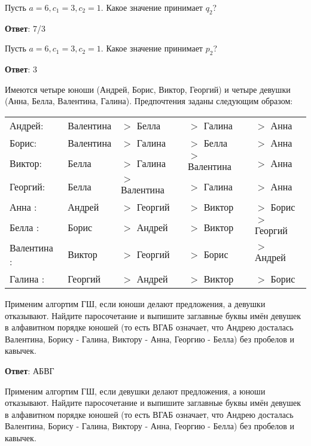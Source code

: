 \task
Пусть $a = 6, c_1 = 3, c_2 = 1$. Какое значение принимает $q_2$?

\textbf{Ответ}: 
7/3	 %

\solution %

\task Пусть $a=6, c_1=3, c_2=1$. Какое значение принимает $p_2$?

\textbf{Ответ}: 
3	%

\solution %

\task
Имеются четыре юноши (Андрей, Борис, Виктор, Георгий) и четыре девушки (Анна, Белла, Валентина, Галина). Предпочтения заданы следующим образом:

\begin{tabular}{lllll}
	\hline
	Андрей: &Валентина &$>$ Белла &$>$ Галина &$>$ Анна \\
	
	Борис:&Валентина &$>$ Галина &$>$ Белла &$>$ Анна \\
	
	Виктор:&Белла &$>$ Галина &$>$ Валентина &$>$ Анна \\
	
	Георгий:&Белла&$>$ Валентина &$>$ Галина &$>$ Анна \\
	
	Анна :&Андрей &$>$ Георгий &$>$ Виктор &$>$ Борис \\
	
	Белла :&Борис &$>$ Андрей &$>$ Виктор &$>$ Георгий \\
	
	Валентина :&Виктор &$>$ Георгий &$>$ Борис &$>$ Андрей \\
	
	Галина :&Георгий &$>$ Андрей &$>$ Виктор &$>$ Борис \\
	\hline
\end{tabular}

Применим алгортим ГШ, если юноши делают предложения, а девушки отказывают. Найдите паросочетание и выпишите заглавные буквы имён девушек в алфавитном порядке юношей (то есть ВГАБ означает, что Андрею досталась Валентина, Борису - Галина, Виктору - Анна, Георгию - Белла) без пробелов и кавычек.

\textbf{Ответ}: 
АБВГ	%

\solution %

\task 
Применим алгортим ГШ, если девушки делают предложения, а юноши отказывают. Найдите паросочетание и выпишите заглавные буквы имён девушек в алфавитном порядке юношей (то есть ВГАБ означает, что Андрею досталась Валентина, Борису - Галина, Виктору - Анна, Георгию - Белла) без пробелов и кавычек.

